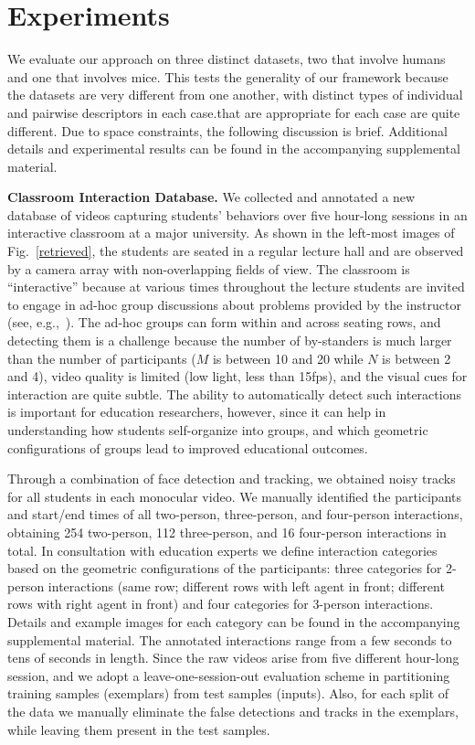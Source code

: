 \section{Experiments}
\label{expall}

We evaluate our approach on three distinct datasets, two that involve humans and one that involves mice. This tests the generality of our framework because the datasets are very different from one another, with distinct types of individual and pairwise descriptors in each case.that are appropriate for each case are quite different. Due to space constraints, the following discussion is brief. Additional details and experimental results can be found in the accompanying supplemental material.

\vspace{0.05in}\noindent\textbf{Classroom Interaction Database.} We collected and annotated a new database of videos capturing students' behaviors over five hour-long sessions in an interactive classroom at a major university. As shown in the left-most images of Fig.~\ref{retrieved}, the students are seated in a regular lecture hall and are observed by a camera array with non-overlapping fields of view. The classroom is ``interactive'' because at various times throughout the lecture students are invited to engage in ad-hoc group discussions about problems provided by the instructor (see, e.g.,~\cite{Crouch:PI}). The ad-hoc groups can form within and across seating rows, and detecting them is a challenge because the number of by-standers  is much larger than the number of participants ($M$ is between 10 and 20 while $N$ is between 2 and 4), video quality is limited (low light, less than 15fps), and the visual cues for interaction are quite subtle. The ability to automatically detect such interactions is important for education researchers, however, since it can help in understanding how students self-organize into groups, and which geometric configurations of groups lead to improved educational outcomes.

Through a combination of face detection and tracking, we obtained noisy tracks for all students in each monocular video. We manually identified the participants and start/end times of all two-person, three-person, and four-person interactions, obtaining 254 two-person, 112 three-person, and 16 four-person interactions in total. In consultation with education experts we define interaction categories based on the geometric configurations of the participants: three categories for 2-person interactions (same row; different rows with left agent in front; different rows with right agent in front) and four categories for 3-person interactions. Details and example images for each category can be found in the accompanying supplemental material. The annotated interactions range from a few seconds to tens of seconds in length. Since the raw videos arise from five different hour-long session, and we adopt a leave-one-session-out evaluation scheme in partitioning  training samples (exemplars) from test samples (inputs). Also, for each split of the data we manually eliminate the false detections and tracks in the exemplars, while leaving them present in the test samples. 

